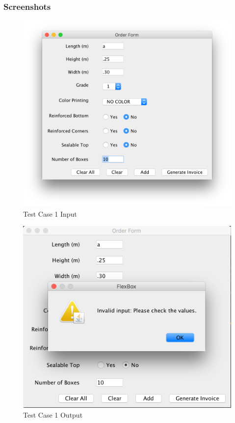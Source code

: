 \documentclass[12pt]{article}
\begin{document}
\subsubsection{Screenshots}
\begin{figure}[H]
\includegraphics[width=\linewidth]{./screenshots/test_case_1_input.png}
\caption{Test Case 1 Input}
\label{test_case_1_input}
\end{figure}
\begin{figure}[H]
	\includegraphics[width=\linewidth]{./screenshots/test_case_1_output.png}
	\caption{Test Case 1 Output}
	\label{test_case_1_output}
\end{figure}
\newpage
\end{document}
